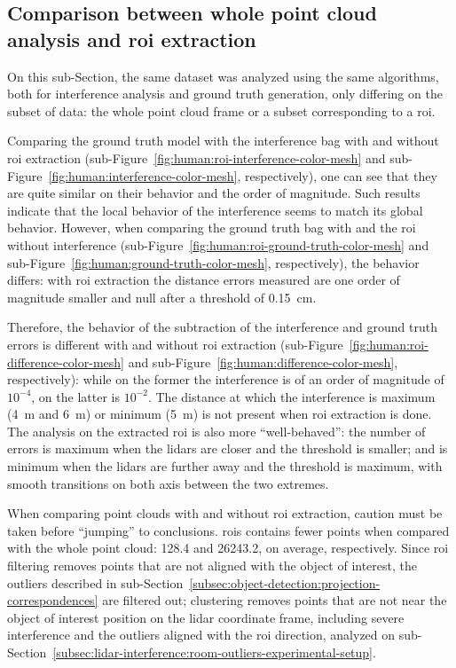 \subsection{Comparison between whole point cloud analysis and \ac{roi} extraction}
On this sub-Section, the same dataset was analyzed using the same algorithms, both for interference analysis and ground truth generation, only differing on the subset of data: the whole point cloud frame or a subset corresponding to a \ac{roi}.

Comparing the ground truth model with the interference bag with and without \ac{roi} extraction (sub-Figure~\ref{fig:human:roi-interference-color-mesh} and sub-Figure~\ref{fig:human:interference-color-mesh}, respectively), one can see that they are quite similar on their behavior and the order of magnitude. Such results indicate that the local behavior of the interference seems to match its global behavior. However, when comparing the ground truth bag with and the \ac{roi} without interference (sub-Figure~\ref{fig:human:roi-ground-truth-color-mesh} and sub-Figure~\ref{fig:human:ground-truth-color-mesh}, respectively), the behavior differs: with \ac{roi} extraction the distance errors measured are one order of magnitude smaller and null after a threshold of \SI{0.15}{\centi\meter}. 

Therefore, the behavior of the subtraction of the interference and ground truth errors is different with and without \ac{roi} extraction (sub-Figure~\ref{fig:human:roi-difference-color-mesh} and sub-Figure~\ref{fig:human:difference-color-mesh}, respectively): while on the former the interference is of an order of magnitude of $10^{-4}$, on the latter is $10^{-2}$. The distance at which the interference is maximum (\SI{4}{\meter} and \SI{6}{\meter}) or minimum (\SI{5}{\meter}) is not present when \ac{roi} extraction is done. The analysis on the extracted \ac{roi} is also more ``well-behaved'': the number of errors is maximum when the \acp{lidar} are closer and the threshold is smaller; and is minimum when the \acp{lidar} are further away and the threshold is maximum, with smooth transitions on both axis between the two extremes.

When comparing point clouds with and without \ac{roi} extraction, caution must be taken before  ``jumping'' to conclusions. \acp{roi} contains fewer points when compared with the whole point cloud: 128.4 and 26243.2, on average, respectively. Since \ac{roi} filtering removes points that are not aligned with the object of interest, the outliers described in sub-Section~\ref{subsec:object-detection:projection-correspondences} are filtered out; clustering removes points that are not near the object of interest position on the \ac{lidar} coordinate frame, including severe interference and the outliers aligned with the \ac{roi} direction, analyzed on sub-Section~\ref{subsec:lidar-interference:room-outliers-experimental-setup}.

